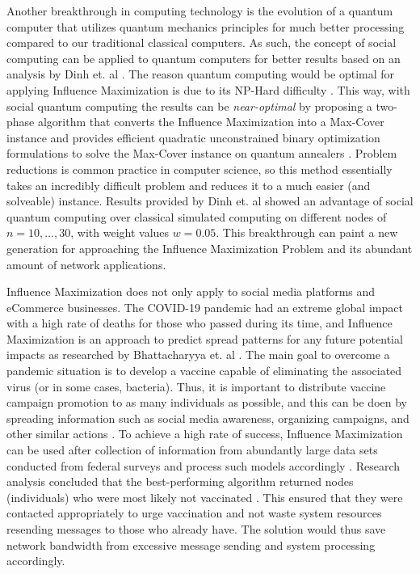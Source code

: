 \documentclass[12pt]{article}
\begin{document}
Another breakthrough in computing technology is the evolution of a quantum computer that utilizes quantum mechanics principles for much better processing compared to our traditional classical computers. 
As such, the concept of social computing can be applied to quantum computers for better results based on an analysis by Dinh et. al \cite{10000698}. 
The reason quantum computing would be optimal for applying Influence Maximization is due to its NP-Hard difficulty \cite{10000698}. 
This way, with social quantum computing the results can be \emph{near-optimal} by proposing a two-phase algorithm that converts the Influence Maximization into a Max-Cover instance and provides efficient quadratic unconstrained binary optimization formulations to solve the Max-Cover instance on quantum annealers \cite{10000698}. 
Problem reductions is common practice in computer science, so this method essentially takes an incredibly difficult problem and reduces it to a much easier (and solveable) instance. 
Results provided by Dinh et. al showed an advantage of social quantum computing over classical simulated computing on different nodes of $n=10,\ldots,30$, with weight values $w=0.05$. 
This breakthrough can paint a new generation for approaching the Influence Maximization Problem and its abundant amount of network applications.

Influence Maximization does not only apply to social media platforms and eCommerce businesses. 
The COVID-19 pandemic had an extreme global impact with a high rate of deaths for those who passed during its time, and Influence Maximization is an approach to predict spread patterns for any future potential impacts as researched by Bhattacharyya et. al \cite{9668587}. 
The main goal to overcome a pandemic situation is to develop a vaccine capable of eliminating the associated virus (or in some cases, bacteria). 
Thus, it is important to distribute vaccine campaign promotion to as many individuals as possible, and this can be doen by spreading information such as social media awareness, organizing campaigns, and other similar actions \cite{9668587}. 
To achieve a high rate of success, Influence Maximization can be used after collection of information from abundantly large data sets conducted from federal surveys and process such models accordingly \cite{9668587}. 
Research analysis concluded that the best-performing algorithm returned nodes (individuals) who were most likely not vaccinated \cite{9668587}. 
This ensured that they were contacted appropriately to urge vaccination and not waste system resources resending messages to those who already have. 
The solution would thus save network bandwidth from excessive message sending and system processing accordingly.
\end{document}
